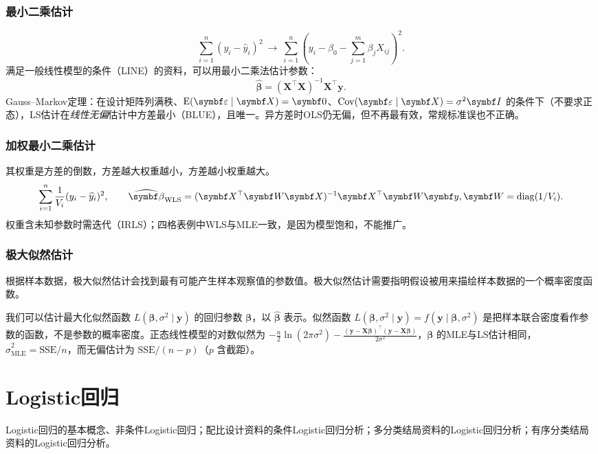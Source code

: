 \subsubsection{最小二乘估计}
\[
\sum_{i=1}^n(y_i-\widehat y_i)^2\ \longrightarrow\
\sum_{i=1}^n\left(y_i-\beta_0-\sum_{j=1}^m\beta_jX_{ij}\right)^2.
\]
满足一般线性模型的条件（LINE）的资料，可以用最小二乘法估计参数：
\[\widehat{\bm\beta}=(\bm X^\top\bm X)^{-1}\bm X^\top\bm y .\]
Gauss--Markov定理：在设计矩阵列满秩、$\E(\bm\varepsilon\mid\bm X)=\bm 0$、$\Cov(\bm\varepsilon\mid\bm X)=\sigma^2\bm I$ 的条件下（不要求正态），LS估计在\emph{线性无偏}估计中方差最小（BLUE），且唯一。异方差时OLS仍无偏，但不再最有效，常规标准误也不正确。
\subsubsection{加权最小二乘估计}
其权重是方差的倒数，方差越大权重越小，方差越小权重越大。
\[
\sum_{i=1}^n\frac1{V_i}(y_i-\widehat y_i)^2,\qquad \widehat{\bm\beta}_{\mathrm{WLS}}=(\bm X^\top\bm W\bm X)^{-1}\bm X^\top\bm W\bm y,\quad\bm W=\diag(1/V_i).
\]
权重含未知参数时需迭代（IRLS）；四格表例中WLS与MLE一致，是因为模型饱和，不能推广。
\subsubsection{极大似然估计}
根据样本数据，极大似然估计会找到最有可能产生样本观察值的参数值。极大似然估计需要指明假设被用来描绘样本数据的一个概率密度函数。

我们可以估计最大化似然函数 $L(\bm\beta,\sigma^2\mid\bm y)$ 的回归参数 $\bm\beta$，以 $\widehat{\bm\beta}$ 表示。似然函数 $L(\bm\beta,\sigma^2\mid\bm y)=f(\bm y\mid\bm\beta,\sigma^2)$ 是把样本联合密度看作参数的函数，不是参数的概率密度。正态线性模型的对数似然为 $-\frac n2\ln(2\pi\sigma^2)-\frac{(\bm y-\bm X\bm\beta)^\top(\bm y-\bm X\bm\beta)}{2\sigma^2}$，$\bm\beta$ 的MLE与LS估计相同，$\widehat\sigma^2_{\mathrm{MLE}}=\mathrm{SSE}/n$，而无偏估计为 $\mathrm{SSE}/(n-p)$（$p$ 含截距）。
\section{Logistic回归}
Logistic回归的基本概念、非条件Logistic回归；配比设计资料的条件Logistic回归分析；多分类结局资料的Logistic回归分析；有序分类结局资料的Logistic回归分析。
